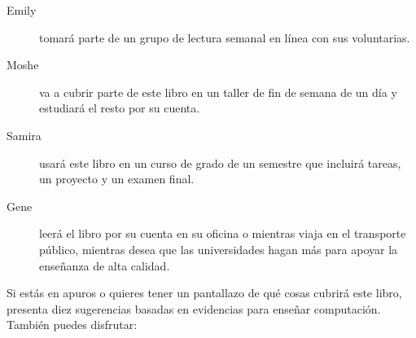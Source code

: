\begin{description}

\item[Emily]
  tomará parte de un grupo de lectura semanal en línea con sus voluntarias.

\item[Moshe]
  va a cubrir parte de este libro en un taller de fin de semana de un día y estudiará el resto por su cuenta. 

\item[Samira]
  usará este libro en un curso de grado de un semestre que incluirá tareas, un proyecto y un examen final. 

\item[Gene]
  leerá el libro por su cuenta en su oficina o mientras viaja en el transporte público, mientras desea que las universidades hagan más para apoyar la enseñanza de alta calidad. 

\end{description}

Si estás en apuros o quieres tener un pantallazo de qué cosas cubrirá este libro,
\cite{Brow2018} presenta diez sugerencias basadas en evidencias para enseñar computación.
También puedes disfrutar:

